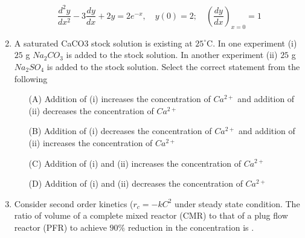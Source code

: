\documentclass[journal]{IEEEtran}
\numberwithin{equation}{enumi}
\numberwithin{figure}{enumi}
\begin{document}
\begin{enumerate}[start=1, label={Q\arabic*.}]
\[\frac{d^{2}y}{dx^{2}} - 3\frac{dy}{dx} + 2y= 2e^{-x}, \quad y(0) =2; \quad \left(\frac{dy}{dx}\right )_{x=0} = 1\]
 \begin{enumerate}[label=(\Alph*)]
  \end{enumerate}
\item A saturated CaCO3 stock solution is existing at $25^\circ$C. In one experiment (i) $25$ g
$Na_2 CO_3$ is added to the stock solution. In another experiment (ii) $25$ g $Na_2 SO_4$ is added
to the stock solution. Select the correct statement from the following
\begin{itemize}
  \item[(A)] Addition of (i) increases the concentration of $Ca^{2+}$ and addition of (ii) decreases the
concentration of $Ca^{2+}$
  \item[(B)] Addition of (i) decreases the concentration of $Ca^{2+}$ and addition of (ii) increases the
concentration of $Ca^{2+}$
  \item[(C)] Addition of (i) and (ii) increases the concentration of $Ca^{2+}$
  \item[(D)] Addition of (i) and (ii) decreases the concentration of $Ca^{2+}$
  \end{itemize}
\item Consider second order kinetics ($r_c = -k C^2$ under steady state condition. The ratio of
volume of a complete mixed reactor (CMR) to that of a plug flow reactor (PFR) to achieve
$90\%$ reduction in the concentration is \underline{\hspace{1.5cm}}.


\end{enumerate}
\end{document}
